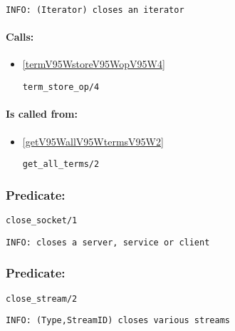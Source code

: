 {\small \begin{verbatim}
INFO: (Iterator) closes an iterator

\end{verbatim}}
\paragraph{Calls:} 
\begin{itemize}
\item \ref{termV95WstoreV95WopV95W4} 
\begin{verbatim}
term_store_op/4
\end{verbatim}

\end{itemize}
\paragraph{Is called from:} 
\begin{itemize}
\item \ref{getV95WallV95WtermsV95W2} 
\begin{verbatim}
get_all_terms/2
\end{verbatim}

\end{itemize}

\subsubsection{Predicate:} \label{closeV95WsocketV95W1}

\begin{verbatim}
close_socket/1
\end{verbatim}

{\small \begin{verbatim}
INFO: closes a server, service or client

\end{verbatim}}

\subsubsection{Predicate:} \label{closeV95WstreamV95W2}

\begin{verbatim}
close_stream/2
\end{verbatim}

{\small \begin{verbatim}
INFO: (Type,StreamID) closes various streams

\end{verbatim}}
